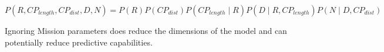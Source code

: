 \documentclass{UoYCSproject}
\begin{document}
\[P(R,CP_{length},CP_{dist},D,N) = P(R)P(CP_{dist})P(CP_{length} \mid R)P(D \mid R, CP_{length})P(N \mid D, CP_{dist})\]

Ignoring Mission parameters does reduce the dimensions of the model and can potentially reduce predictive capabilities.
\end{document}
